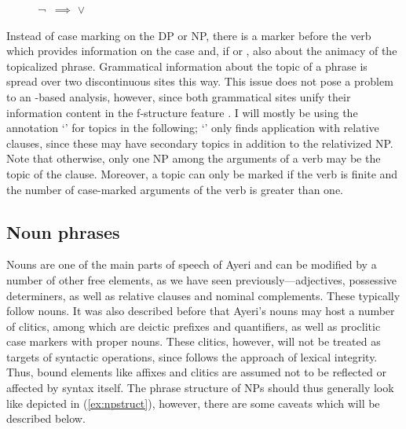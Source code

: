 \begin{figure}[h]
\ex\label{ex:topicrule}
¬\,\downs{\Case} $\implies$ \pass{\Top} $\vee$ \elem{\Top}
\xe
\end{figure}

Instead of case marking on the DP or NP, there is a marker before the verb
which provides information on the case and, if \AgtT{} or \PatT{}, also about
the animacy of the topicalized phrase. Grammatical information about the topic
of a phrase is spread over two discontinuous sites this way. This issue does
not pose a problem to an \Lfg{}-based analysis, however, since both grammatical
sites unify their information content in the f-structure feature \Top{}. I will
mostly be using the annotation `\pass{\Top}' for topics in the following;
`\elem{\Top}' only finds application with relative clauses, since these may
have secondary topics in addition to the relativized NP. Note that otherwise,
only one NP among the arguments of a verb may be the topic of the clause.
Moreover, a topic can only be marked if the verb is finite and the number of
case-marked arguments of the verb is greater than one.

\subsection{Noun phrases}
\label{subsec:nps}


Nouns are one of the main parts of speech of Ayeri and can be modified by a
number of other free elements, as we have seen previously---adjectives,
possessive determiners, as well as relative clauses and nominal complements. These
typically follow nouns. It was also described before that Ayeri's nouns may
host a number of clitics, among which are deictic prefixes and quantifiers, as
well as proclitic case markers with proper nouns. These clitics, however, will
not be treated as targets of syntactic operations, since \Lfg{} follows the
approach of lexical integrity. Thus, bound elements like affixes and clitics
are assumed not to be reflected or affected by syntax itself. The phrase
structure of NPs should thus generally look like depicted in
(\ref{ex:npstruct}), however, there are some caveats which will be described
below.

